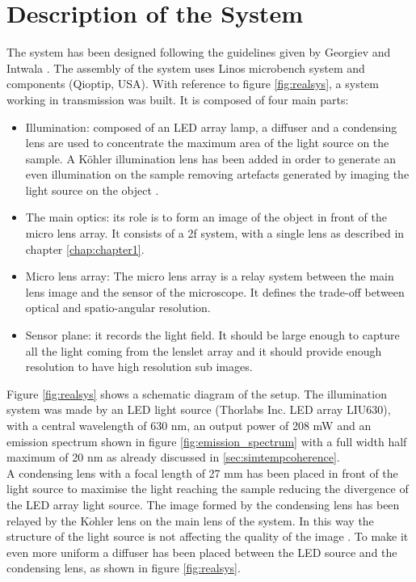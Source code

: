 \section{Description of the System}
The system has been designed following the guidelines given by Georgiev and Intwala \cite{georgiev2006light}. The assembly of the system uses Linos microbench system and components (Qioptip, USA).
With reference to figure \ref{fig:realsys}, a system working in transmission was built. It is composed of four main parts: 
\begin{itemize}
	\item Illumination: composed of an LED array lamp, a diffuser and a condensing lens are used to concentrate the maximum area of the light source on the sample. A K\"ohler illumination lens has been added in order to generate an even illumination on the sample removing artefacts generated by imaging the light source on the object \cite{kohler1893new,kohler1934device}. 
	\item The main optics: its role is to form an image of the object in front of the micro lens array. It consists of a 2f system, with a single lens as described in chapter \ref{chap:chapter1}.
	\item Micro lens array: The micro lens array is a relay system between the main lens image and the sensor of the microscope. It defines the trade-off between optical and spatio-angular resolution.
	\item Sensor plane: it records the light field. It should be large enough to capture all the light coming from the lenslet array and it should provide enough resolution to have high resolution sub images.
\end{itemize}
Figure \ref{fig:realsys} shows a schematic diagram of the setup. The illumination system was made by an LED light source (Thorlabs Inc. LED array LIU630), with a central wavelength of 630 nm, an output power of 208 mW and an emission spectrum shown in figure \ref{fig:emission_spectrum} with a full width half maximum of 20 nm as already discussed in \ref{sec:simtempcoherence}.
\\
A condensing lens with a focal length of 27 mm has been placed in front of the light source to maximise the light reaching the sample reducing the divergence of the LED array light source. The image formed by the condensing lens has been relayed by the K$\ddot{o}$hler lens on the main lens of the system. In this way the structure of the light source is not affecting the quality of the image \cite{kohler1893new}. To make it even more uniform a diffuser has been placed between the LED source and the condensing lens, as shown in figure \ref{fig:realsys}.\\
